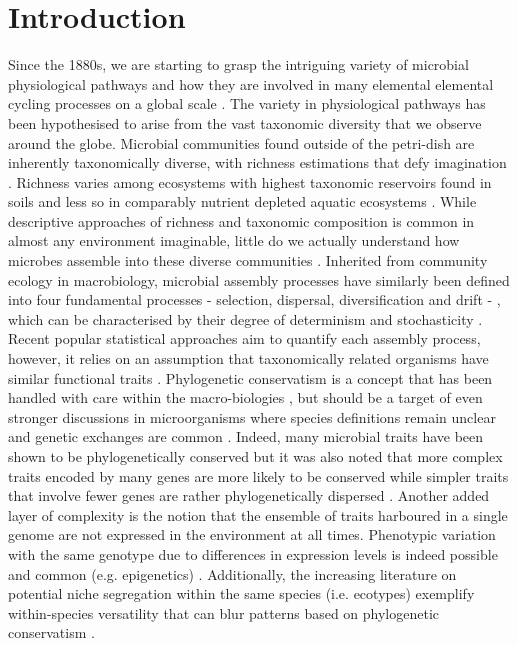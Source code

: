 \documentclass[12pt,a4paper]{article} %
\begin{document}
\section*{Introduction}
Since the 1880s, we are starting to grasp the intriguing variety of microbial physiological pathways and how they are involved in many elemental elemental cycling processes on a global scale \citep{Caumette2015}. The variety in physiological pathways has been hypothesised to arise from the vast taxonomic diversity that we observe around the globe. Microbial communities found outside of the petri-dish are inherently taxonomically diverse, with richness estimations that defy imagination \citep{Thompson2017, Louca2019}. Richness varies among ecosystems with highest taxonomic reservoirs found in soils and less so in comparably nutrient depleted aquatic ecosystems \citep{Thompson2017}. While descriptive approaches of richness and taxonomic composition is common in almost any environment imaginable, little do we actually understand how microbes assemble into these diverse communities \citep{Shade2017a, Shade2018}. Inherited from community ecology in macrobiology, microbial assembly processes have similarly been defined into four fundamental processes - selection, dispersal, diversification and drift - \citep{Vellend2010}, which can be characterised by their degree of determinism and stochasticity \citep{Zhou2017}. Recent popular statistical approaches aim to quantify each assembly process, however, it relies on an assumption that taxonomically related organisms have similar functional traits \citep{Stegen2013a, Stegen2015a}. Phylogenetic conservatism is a concept that has been handled with care within the macro-biologies \citep{Losos2008, Warren2008}, but should be a target of even stronger discussions in microorganisms where species definitions remain unclear \citep{Achtman2008} and genetic exchanges are common \citep{Thomas2005}. Indeed, many microbial traits have been shown to be phylogenetically conserved \citep{Martiny2015} but it was also noted that more complex traits encoded by many genes are more likely to be conserved while simpler traits that involve fewer genes are rather phylogenetically dispersed \citep{Martiny2013a}. Another added layer of complexity is the notion that the ensemble of traits harboured in a single genome are not expressed in the environment at all times. Phenotypic variation with the same genotype due to differences in expression levels is indeed possible and common (e.g. epigenetics) \citep{Caumette2015}. Additionally, the increasing literature on potential niche segregation within the same species (i.e. ecotypes) \citep{VanRossum2020} exemplify within-species versatility that can blur patterns based on phylogenetic conservatism \citep{Achtman2008, Ackermann2015, Chase2018}.
\end{document}
